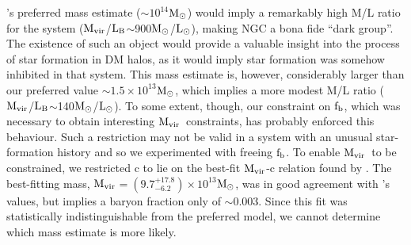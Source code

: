 \documentclass{emulateapj}
\def \msun {${\rm M_\odot}$}
\newcommand{\mvir}{${\rm M_{vir}}$}
\newcommand{\lb }{${\rm L_B}$}
\newcommand{\fbaryons}{${\rm f_{b}}$}
\newcommand{\lsun }{${\rm L_\odot}$}
\newcommand{\thin}{\thinspace}
\begin{document}
\citeauthor{gould93a}'s preferred mass estimate 
($\sim10^{14}$\msun) would imply a remarkably high M/L ratio
for the system (\mvir/\lb$\sim$900\msun/\lsun), making NGC\thin 1407 
a bona fide ``dark group''. The existence of such an object 
would provide a valuable insight into the process of star 
formation in DM halos, as it would imply star formation was 
somehow inhibited in that system. This mass estimate is, however,
considerably larger than our preferred value
$\sim 1.5 \times 10^{13}$\msun, which implies a more modest
M/L ratio (\mvir/\lb$\sim$140\msun/\lsun). 
To some extent, though, our constraint
on \fbaryons, which was necessary to obtain interesting \mvir\
constraints,  has probably enforced this behaviour.
Such a restriction
may not be valid in a system with an unusual star-formation history
and so we experimented with freeing \fbaryons.
To enable \mvir\ to be constrained,  we
restricted c to lie on the 
best-fit \mvir-c relation found by \citet{bullock01a}. 
The best-fitting mass,
\mvir$=(9.7^{+17.8}_{-6.2})\times 10^{13}$\msun, was in good agreement 
with \citet{gould93a}'s values, but implies a baryon fraction
only of $\sim$0.003. Since this fit was statistically 
indistinguishable from the preferred model, we cannot
determine which mass estimate is more likely.
\end{document}
